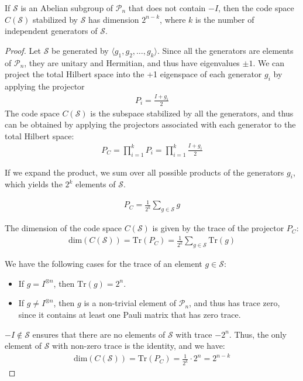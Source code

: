 \documentclass[12pt, twoside, openany]{book}
\begin{document}
\begin{proposition}
If $\mathcal{S}$ is an Abelian subgroup of $\mathcal{P}_n$ that does not contain $-I$, then the code space $C(\mathcal{S})$ stabilized by $\mathcal{S}$ has dimension $2^{n - k}$, where $k$ is the number of independent generators of $\mathcal{S}$.
\end{proposition}
\begin{proof}
Let $\mathcal{S}$ be generated by $\langle g_1, g_2, \ldots, g_k \rangle$. Since all the generators are elements of $\mathcal{P}_n$, they are unitary and Hermitian, and thus have eigenvalues $\pm 1$. We can project the total Hilbert space into the +1 eigenspace of each generator $g_i$ by applying the projector
\begin{align*}
    P_i = \frac{I + g_i}{2} 
\end{align*}
The code space $C(\mathcal{S})$ is the subspace stabilized by all the generators, and thus can be obtained by applying the projectors associated with each generator to the total Hilbert space:
\begin{align*}
    P_C = \prod_{i=1}^k P_i = \prod_{i=1}^k \frac{I + g_i}{2} 
\end{align*}

If we expand the product, we sum over all possible products of the generators $g_i$, which yields the $2^k$ elements of $\mathcal{S}$.

\begin{align*}
    P_C = \frac{1}{2^k} \sum_{g \in \mathcal{S}} g    
\end{align*}

The dimension of the code space $C(\mathcal{S})$ is given by the trace of the projector $P_C$:
\begin{align*}
    \text{dim}(C(\mathcal{S})) = \text{Tr}(P_C) = \frac{1}{2^k} \sum_{g \in \mathcal{S}} \text{Tr}(g)
\end{align*}

We have the following cases for the trace of an element $g \in \mathcal{S}$:
\begin{itemize}
    \item If $g = I^{\otimes n}$, then $\text{Tr}(g) = 2^n$.
    \item If $g \neq I^{\otimes n}$, then $g$ is a non-trivial element of $\mathcal{P}_n$, and thus has trace zero, since it contains at least one Pauli matrix that has zero trace.
\end{itemize}

$-I \notin \mathcal{S}$ ensures that there are no elements of $\mathcal{S}$ with trace $-2^n$. Thus, the only element of $\mathcal{S}$ with non-zero trace is the identity, and we have:
\begin{align*}
    \text{dim}(C(\mathcal{S})) = \text{Tr}(P_C) = \frac{1}{2^k} \cdot 2^n = 2^{n-k}
\end{align*}
\end{proof}
\end{document}

